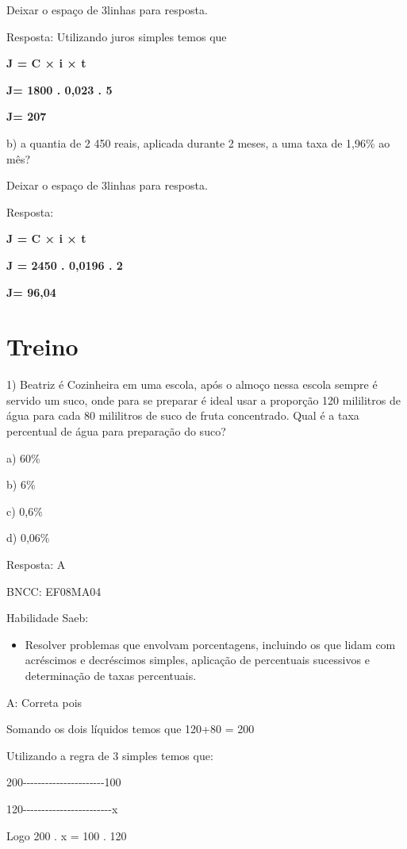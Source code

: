 Deixar o espaço de 3linhas para resposta.

Resposta: Utilizando juros simples temos que

\textbf{J = C × i × t}

\textbf{J= 1800 . 0,023 . 5}

\textbf{J= 207}

b) a quantia de 2 450 reais, aplicada durante 2 meses, a uma taxa de
1,96\% ao mês?

Deixar o espaço de 3linhas para resposta.

Resposta:

\textbf{J = C × i × t}

\textbf{J = 2450 . 0,0196 . 2}

\textbf{J= 96,04}

\section{Treino}

1) Beatriz é Cozinheira em uma escola, após o almoço nessa escola sempre
é servido um suco, onde para se preparar é ideal usar a proporção 120
mililitros de água para cada 80 mililitros de suco de fruta concentrado.
Qual é a taxa percentual de água para preparação do suco?

a) 60\%

b) 6\%

c) 0,6\%

d) 0,06\%

Resposta: A

BNCC: EF08MA04

Habilidade Saeb:

\begin{itemize}
\tightlist
\item
  Resolver problemas que envolvam porcentagens, incluindo os que lidam
  com acréscimos e decréscimos simples, aplicação de percentuais
  sucessivos e determinação de taxas percentuais.
\end{itemize}

A: Correta pois

Somando os dois líquidos temos que 120+80 = 200

Utilizando a regra de 3 simples temos que:

200-\/-\/-\/-\/-\/-\/-\/-\/-\/-\/-\/-\/-\/-\/-\/-\/-\/-\/-\/-\/-\/-100

120-\/-\/-\/-\/-\/-\/-\/-\/-\/-\/-\/-\/-\/-\/-\/-\/-\/-\/-\/-\/-\/-\/-\/-x

Logo 200 . x = 100 . 120

